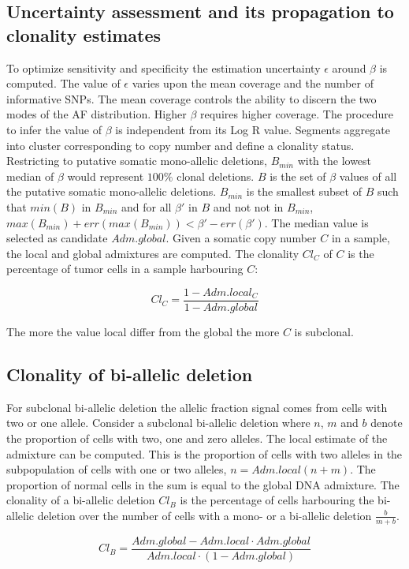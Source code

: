 	\subsection{Uncertainty assessment and its propagation to clonality estimates}
	To optimize sensitivity and specificity the estimation uncertainty $\epsilon$ around $\beta$ is computed.
	The value of $\epsilon$ varies upon the mean coverage and the number of informative SNPs.
	The mean coverage controls the ability to discern the two modes of the AF distribution.
	Higher $\beta$ requires higher coverage.
	The procedure to infer the value of $\beta$ is independent from its Log R value.
	Segments aggregate into cluster corresponding to copy number and define a clonality status.
	Restricting to putative somatic mono-allelic deletions, $B_{min}$ with the lowest median of $\beta$ would represent $100\%$ clonal deletions.
	$B$ is the set of $\beta$ values of all the putative somatic mono-allelic deletions.
	$B_{min}$ is the smallest subset of $B$ such that $min(B)$ in $B_{min}$ and for all $\beta'$ in $B$ and not not in $B_{min}$, $max(B_{min})+err(max(B_{min})) < \beta'-err(\beta')$.
	The median value is selected as candidate $Adm.global$.
	Given a somatic copy number $C$ in a sample, the local and global admixtures are computed.
	The clonality $Cl_C$ of $C$ is the percentage of tumor cells in a sample harbouring $C$:

	$$Cl_C = \frac{1-Adm.local_C}{1-Adm.global}$$

	The more the value local differ from the global the more $C$ is subclonal.

	\subsection{Clonality of bi-allelic deletion}
	For subclonal bi-allelic deletion the allelic fraction signal comes from cells with two or one allele.
	Consider a subclonal bi-allelic deletion where $n$, $m$ and $b$ denote the proportion of cells with two, one and zero alleles.
	The local estimate of the admixture can be computed.
	This is the proportion of cells with two alleles in the subpopulation of cells with one or two alleles, $n = Adm.local(n+m)$.
	The proportion of normal cells in the sum is equal to the global DNA admixture.
	The clonality of a bi-allelic deletion $Cl_B$ is the percentage of cells harbouring the bi-allelic deletion over the number of cells with a mono- or a bi-allelic deletion $\frac{b}{m+b}$.

	$$Cl_B = \frac{Adm.global - Adm.local\cdot Adm.global}{Adm.local\cdot(1-Adm.global)}$$
